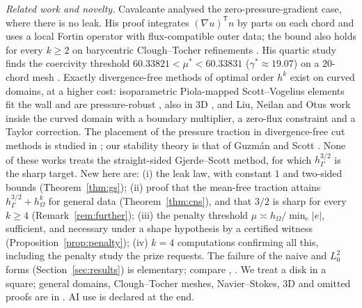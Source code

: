 \documentclass[5p,times]{elsarticle}
\theoremstyle{definition}
\newcommand{\hG}{h_\Gamma}
\newcommand{\hO}{h_\Omega}
\begin{document}
\emph{Related work and novelty.} Cavalcante \cite{Cavalcante2026} analysed the zero-pressure-gradient case, where there is no leak. His proof integrates $(\nabla u)^{\mathsf T}n$ by parts on each chord and uses a local Fortin operator with flux-compatible outer data; the bound also holds for every $k\ge2$ on barycentric Clough--Tocher refinements \cite[Cor.~5.3]{Cavalcante2026}. His quartic study finds the coercivity threshold $60.33821<\mu^\ast<60.33831$ ($\gamma^\ast\approx19.07$) on a $20$-chord mesh \cite[(35)]{Cavalcante2026}.
 Exactly divergence-free methods of optimal order $h^k$ exist on curved domains, at a higher cost: isoparametric Piola-mapped Scott--Vogelius elements fit the wall and are pressure-robust \cite[Thm.~6.1]{NeilanOtus2021}, also in 3D \cite{ChenLiu2026}, and Liu, Neilan and Otus \cite{LiuNeilanOtus2023} work inside the curved domain with a boundary multiplier, a zero-flux constraint and a Taylor correction. The placement of the pressure traction in divergence-free cut methods is studied in \cite{LiuNeilanOlshanskii2023,FrachonNilssonZahedi2024}; our stability theory is that of Guzm\'an and Scott \cite{GuzmanScott2019}. None of these works treats the straight-sided Gjerde--Scott method, for which $\hG^{3/2}$ is the sharp target. New here are: (i) the leak law, with constant $1$ and two-sided bounds (Theorem~\ref{thm:gs}); (ii) proof that the mean-free traction attains $\hG^{3/2}+\hO^k$ for general data (Theorem~\ref{thm:cns}), and that $3/2$ is sharp for every $k\ge4$ (Remark~\ref{rem:further}); (iii) the penalty threshold $\mu\asymp\hO/\min_e|e|$, sufficient, and necessary under a shape hypothesis by a certified witness (Proposition~\ref{prop:penalty}); (iv) $k=4$ computations confirming all this, including the penalty study the prize requests. The failure of the naive and $L^2_0$ forms (Section~\ref{sec:results}) is elementary; compare \cite[(5.7)--(5.9)]{FrachonNilssonZahedi2024}, \cite[Remark~3.2]{LiuNeilanOtus2023}. We treat a disk in a square; general domains, Clough--Tocher meshes, Navier--Stokes, 3D and omitted proofs are in \cite{PadhiExt}. AI use is declared at the end.
\end{document}
